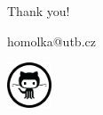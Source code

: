 \documentclass[12pt]{beamer}\usepackage[]{graphicx}\usepackage[]{color}
\begin{document}

\begin{frame}\centering\Large
Thank you! \bigskip 

homolka@utb.cz\bigskip 

\href{https://github.com/luboRprojects/tidyWorkshop}{\includegraphics[width=0.1\textwidth,height=0.1\textheight,keepaspectratio]{./Images/github}}



\end{frame}
\end{document}
